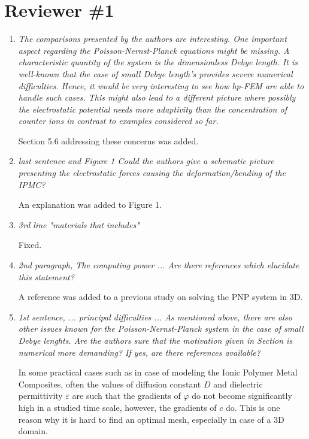 \documentclass[mathpazo]{cicp}
\begin{document}
\section{Reviewer \#1}

\begin{enumerate}
\item \emph{The comparisons presented by the authors are interesting. One important aspect regarding the
Poisson-Nernst-Planck equations might be missing. A characteristic quantity of the system is the
dimensionless Debye length. It is well-known that the case of small Debye length’s provides severe
numerical difficulties. Hence, it would be very interesting to see how hp-FEM are able to handle
such cases. This might also lead to a different picture where possibly the electrostatic potential
needs more adaptivity than the concentration of counter ions in contrast to examples considered so
far.}

Section 5.6 addressing these concerns was added.

\item \emph{last sentence and Figure 1 Could the authors give a schematic picture presenting the electrostatic forces causing the deformation/bending of the IPMC?}

An explanation was added to Figure 1.

\item \emph{3rd line "materials that includes"}

Fixed.

\item \emph{2nd paragraph, The computing power ... Are there references which elucidate this statement?}

A reference was added to a previous study on solving the PNP system in 3D.

\item \emph{1st sentence, ... principal difficulties ... As mentioned above, there are also other issues
known for the Poisson-Nernst-Planck system in the case of small Debye lenghts. Are the
authors sure that the motivation given in Section is numerical more demanding? If yes, are
there references available?}

In some practical cases such as in case of modeling the Ionic Polymer Metal Composites,
often the values of diffusion constant $D$ and dielectric permittivity $\varepsilon$ are such
that the gradients of $\varphi$ do not become significantly high in a studied time scale, however,
the gradients of $c$ do. This is one reason why it is hard to find an optimal mesh, especially
in case of a 3D domain.


\end{enumerate}
\end{document}

